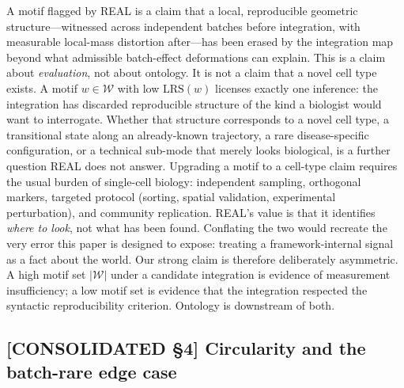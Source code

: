 A motif flagged by REAL is a claim that a local, reproducible geometric structure---witnessed across independent batches before integration, with measurable local-mass distortion after---has been erased by the integration map beyond what admissible batch-effect deformations can explain. This is a claim about \emph{evaluation}, not about ontology. It is not a claim that a novel cell type exists. A motif $w \in \mathcal{W}$ with low $\mathrm{LRS}(w)$ licenses exactly one inference: the integration has discarded reproducible structure of the kind a biologist would want to interrogate. Whether that structure corresponds to a novel cell type, a transitional state along an already-known trajectory, a rare disease-specific configuration, or a technical sub-mode that merely looks biological, is a further question REAL does not answer. Upgrading a motif to a cell-type claim requires the usual burden of single-cell biology: independent sampling, orthogonal markers, targeted protocol (sorting, spatial validation, experimental perturbation), and community replication. REAL's value is that it identifies \emph{where to look}, not what has been found. Conflating the two would recreate the very error this paper is designed to expose: treating a framework-internal signal as a fact about the world. Our strong claim is therefore deliberately asymmetric. A high motif set $|\mathcal{W}|$ under a candidate integration is evidence of measurement insufficiency; a low motif set is evidence that the integration respected the syntactic reproducibility criterion. Ontology is downstream of both.

\subsection*{[CONSOLIDATED §4] Circularity and the batch-rare edge case}
\label{philo:circ_batchrare}


